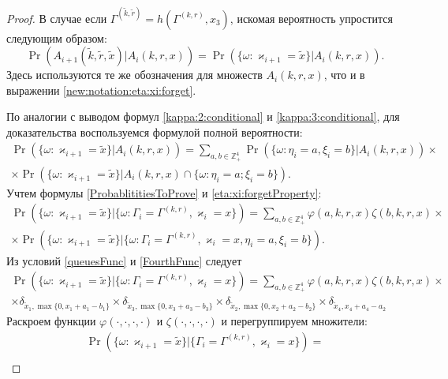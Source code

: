 \begin{proof}
В случае если $\Gamma^{(\tilde{k},  \tilde{r})}=h(\Gamma^{(k,  r)},  x_3)$,   искомая вероятность упростится следующим образом:
\begin{equation*}
\Pr (A_{i+1}(\tilde{k},  \tilde{r},  \tilde{x})| A_{i}({k},  {r},  {x})) 
=\Pr (\{\omega\colon \varkappa_{i+1}=\tilde{x}\}|A_{i}({k},  {r},  {x})).
\end{equation*}
Здесь используются те же обозначения для множеств $A_{i}({k},  {r},  {x})$,   что и в выражении \eqref{new:notation:eta:xi:forget}.

По аналогии с выводом формул \eqref{kappa:2:conditional} и \eqref{kappa:3:conditional},   для доказательства воспользуемся формулой полной вероятности:
\begin{multline*}
\Pr (\{\omega\colon\varkappa_{i+1}=\tilde{x}\}|A_i(k,  r,  x) )= \sum_{a,  b \in \mathbb{Z}_+^4} \Pr (\{\omega\colon\eta_i=a,   \xi_i=b\}|A_i(k,  r,  x)) \times \\ 
\times
\Pr (\{\omega\colon\varkappa_{i+1}=\tilde{x}\}|A_i(k,  r,  x) \cap \{\omega\colon \eta_i=a; \xi_i=b\}).
\end{multline*}
Учтем формулы \eqref{ProbablititiesToProve} и \eqref{eta:xi:forgetProperty}:
\begin{multline*}
\Pr (\{\omega\colon \varkappa_{i+1}=\tilde{x}\}|\{\omega\colon\Gamma_{i}=\Gamma^{(k,  r)},  \varkappa_i=x\})
=\sum_{a,  b \in \mathbb{Z}_+^4} \varphi(a,  k,  r,  x) \zeta(b,  k,  r,  x)
\times \\ \times
\Pr (\{\omega\colon\varkappa_{i+1}=\tilde{x}\}|\{\omega\colon\Gamma_{i}=\Gamma^{(k,  r)},  \varkappa_i=x,   \eta_i=a, \xi_i=b\}).
\end{multline*}
Из условий \eqref{queuesFunc} и \eqref{FourthFunc} следует
\begin{multline*}
\Pr (\{\omega\colon\varkappa_{i+1}=\tilde{x}\}|\{\omega\colon\Gamma_{i}=\Gamma^{(k,  r)},  \varkappa_i=x\})=\sum_{a,  b \in \mathbb{Z}_+^4} \varphi(a,  k,  r,  x) \zeta(b,  k,  r,  x)
\times \\ \times \delta_{\tilde{x}_1,  \max{\{0,  x_1+a_1-b_1\}}} \times 
 \delta_{\tilde{x}_3,  \max{\{0,  x_3+a_3-b_3\}}} \times
\delta_{\tilde{x}_2,  \max{\{0,  x_2+a_2-b_2\}}} \times
\delta_{\tilde{x}_4,  x_4+a_4-a_2}
\end{multline*}
Раскроем  функции $\varphi(\cdot,   \cdot,   \cdot,   \cdot)$ и $\zeta(\cdot,  \cdot,  \cdot,  \cdot)$ и перегруппируем множители:
\begin{multline*}
\Pr (\{\omega\colon\varkappa_{i+1}=\tilde{x}\}|\{\Gamma_{i}=\Gamma^{(k,  r)},  \varkappa_i=x\})= \\

\end{multline*}
\end{proof}
